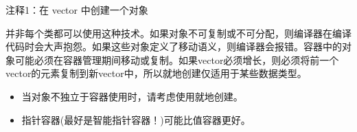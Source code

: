 {\footnotesize
注释1：在 vector 中创建一个对象
}

并非每个类都可以使用这种技术。如果对象不可复制或不可分配，则编译器在编译代码时会大声抱怨。如果这些对象定义了移动语义，则编译器会报错。容器中的对象可能必须在容器管理期间移动或复制。如果vector必须增长，则必须将前一个vector的元素复制到新vector中，所以就地创建仅适用于某些数据类型。


\begin{itemize}
\item
当对象不独立于容器使用时，请考虑使用就地创建。

\item
指针容器(最好是智能指针容器！)可能比值容器更好。
\end{itemize}













